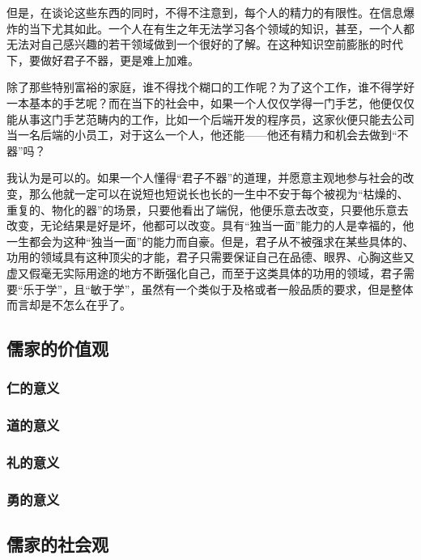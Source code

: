 \documentclass[10pt,a4paper]{article}
\begin{document}
但是，在谈论这些东西的同时，不得不注意到，每个人的精力的有限性。在信息爆炸的当下尤其如此。一个人在有生之年无法学习各个领域的知识，甚至，一个人都无法对自己感兴趣的若干领域做到一个很好的了解。在这种知识空前膨胀的时代下，要做好君子不器，更是难上加难。

除了那些特别富裕的家庭，谁不得找个糊口的工作呢？为了这个工作，谁不得学好一本基本的手艺呢？而在当下的社会中，如果一个人仅仅学得一门手艺，他便仅仅能从事这门手艺范畴内的工作，比如一个后端开发的程序员，这家伙便只能去公司当一名后端的小员工，对于这么一个人，他还能——他还有精力和机会去做到“不器”吗？

我认为是可以的。如果一个人懂得“君子不器”的道理，并愿意主观地参与社会的改变，那么他就一定可以在说短也短说长也长的一生中不安于每个被视为“枯燥的、重复的、物化的器”的场景，只要他看出了端倪，他便乐意去改变，只要他乐意去改变，无论结果是好是坏，他都可以改变。具有“独当一面”能力的人是幸福的，他一生都会为这种“独当一面”的能力而自豪。但是，君子从不被强求在某些具体的、功用的领域具有这种顶尖的才能，君子只需要保证自己在品德、眼界、心胸这些又虚又假毫无实际用途的地方不断强化自己，而至于这类具体的功用的领域，君子需要“乐于学”，且“敏于学”，虽然有一个类似于及格或者一般品质的要求，但是整体而言却是不怎么在乎了。
\subsection{儒家的价值观}
\label{sec:org18ccf52}
\subsubsection{仁的意义}
\label{sec:orgf2c2981}

\subsubsection{道的意义}
\label{sec:org1466631}

\subsubsection{礼的意义}
\label{sec:org313eb0c}

\subsubsection{勇的意义}
\label{sec:orgeaa1285}


\subsection{儒家的社会观}
\label{sec:orgc75cbee}
\end{document}
